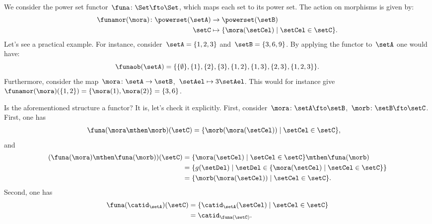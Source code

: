 \begin{example}
    \label{ex:powerset_functor}
    We consider the power set functor~$\funa\colon \Set \fto \Set$, which maps each set to its power set.
    The action on morphisms is given by:
    \begin{equation*}
        \begin{aligned}
            \funamor(\mora)\colon \powerset(\setA)&\to \powerset(\setB)\\
            \setC&\mapsto \{\mora(\setCel) \mid \setCel \in \setC\}.
        \end{aligned}
    \end{equation*}
    Let's see a practical example.
    For instance, consider~$\setA=\{1,2,3\}$ and~$\setB=\{3,6,9\}$.
    By applying the functor to~$\setA$ one would have:
    \begin{equation*}
        \funaob(\setA)=\{\{\emptyset\}, \{1\}, \{2\}, \{3\}, \{1,2\}, \{1,3\}, \{2,3\}, \{1,2,3\}\}.
    \end{equation*}
    Furthermore, consider the map~$\mora\colon \setA\to \setB$,~$\setAel\mapsto 3\setAel$.
    This would for instance give~$\funamor(\mora)(\{1,2\})=\{\mora(1),\mora(2)\}=\{3,6\}$.
    
    Is the aforementioned structure a functor? It is, let's check it explicitly.
    First, consider~$\mora\colon \setA\fto \setB$,~$\morb\colon \setB \fto \setC$.
    First, one has
    \begin{equation*}
        \begin{aligned}
            \funa(\mora\mthen \morb)(\setC)&=\{ \morb(\mora(\setCel))\mid \setCel \in \setC\},
        \end{aligned}
    \end{equation*}
    and
    \begin{equation*}
        \begin{aligned}
        (\funa(\mora)\mthen \funa(\morb))(\setC)
            &=\{ \mora(\setCel) \mid \setCel \in \setC\}\mthen \funa(\morb)\\
            &=\{g(\setDel)\mid \setDel \in \{\mora(\setCel)\mid \setCel\in \setC\}\}\\
            &=\{ \morb(\mora(\setCel))\mid \setCel \in \setC\}.
        \end{aligned}
    \end{equation*}
    Second, one has
    \begin{equation*}
        \begin{aligned}
            \funa(\catid_\setA)(\setC)&= \{\catid_\setA(\setCel)\mid \setCel \in \setC\}\\
            &=\catid_{\funa(\setC)}.
        \end{aligned}
    \end{equation*}
\end{example}


